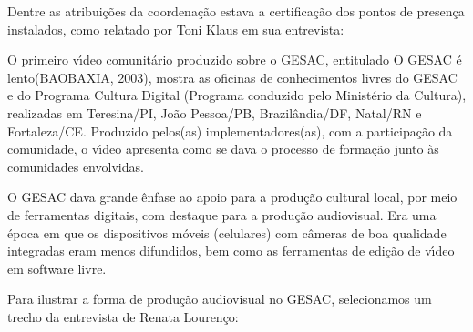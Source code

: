 \documentclass[
12pt,		%
openright,	%
twoside,  %
a4paper,			%
chapter=TITLE,		%
english,			%
french,				%
spanish,			%
brazil				%
]{USPSC-classe/USPSC}
\begin{document}
Dentre as atribui\c{c}\~oes da coordena\c{c}\~ao estava a certifica\c{c}\~ao dos pontos de presen\c{c}a instalados, como relatado por Toni Klaus em sua entrevista:









\noindent\begin{center}\mbox{\centering{}}\end{center}


O primeiro v\'{\i}deo comunit\'ario produzido sobre o GESAC, entitulado \textquotedbl O GESAC \'e lento\textquotedbl   (BAOBAXIA, 2003),  mostra as oficinas de conhecimentos livres do GESAC e do Programa Cultura Digital (Programa conduzido pelo Minist\'erio da Cultura), realizadas em Teresina/PI, Jo\~ao Pessoa/PB, Brazil\^andia/DF, Natal/RN e Fortaleza/CE. Produzido pelos(as) implementadores(as), com a participa\c{c}\~ao da comunidade, o v\'{\i}deo apresenta como se dava o processo de forma\c{c}\~ao junto \`as comunidades envolvidas.








O GESAC dava grande \^enfase ao apoio para a produ\c{c}\~ao cultural local, por meio de ferramentas digitais, com destaque para a produ\c{c}\~ao audiovisual. Era uma \'epoca em que os dispositivos m\'oveis (celulares) com c\^ameras de boa qualidade integradas eram menos difundidos, bem como as ferramentas de edi\c{c}\~ao de v\'{\i}deo em software livre.








Para ilustrar a forma de produ\c{c}\~ao audiovisual no GESAC, selecionamos um trecho da entrevista de Renata Louren\c{c}o:
\end{document}
